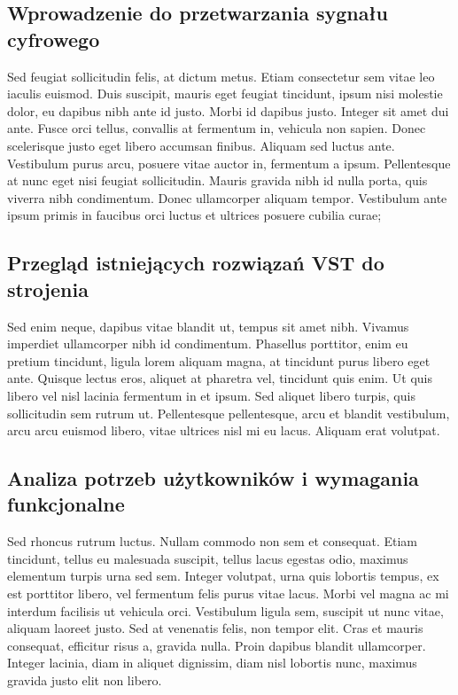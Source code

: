 \subsection{Wprowadzenie do przetwarzania sygnału cyfrowego}
\begin{spacing}{1.5} %
    Sed feugiat sollicitudin felis, at dictum metus. Etiam consectetur sem vitae leo iaculis euismod. Duis suscipit, mauris eget feugiat tincidunt, ipsum nisi molestie dolor, eu dapibus nibh ante id justo. Morbi id dapibus justo. Integer sit amet dui ante. Fusce orci tellus, convallis at fermentum in, vehicula non sapien. Donec scelerisque justo eget libero accumsan finibus. Aliquam sed luctus ante. Vestibulum purus arcu, posuere vitae auctor in, fermentum a ipsum. Pellentesque at nunc eget nisi feugiat sollicitudin. Mauris gravida nibh id nulla porta, quis viverra nibh condimentum. Donec ullamcorper aliquam tempor. Vestibulum ante ipsum primis in faucibus orci luctus et ultrices posuere cubilia curae; 
\end{spacing} %

\subsection{Przegląd istniejących rozwiązań VST do strojenia}
\begin{spacing}{1.5} %
    Sed enim neque, dapibus vitae blandit ut, tempus sit amet nibh. Vivamus imperdiet ullamcorper nibh id condimentum. Phasellus porttitor, enim eu pretium tincidunt, ligula lorem aliquam magna, at tincidunt purus libero eget ante. Quisque lectus eros, aliquet at pharetra vel, tincidunt quis enim. Ut quis libero vel nisl lacinia fermentum in et ipsum. Sed aliquet libero turpis, quis sollicitudin sem rutrum ut. Pellentesque pellentesque, arcu et blandit vestibulum, arcu arcu euismod libero, vitae ultrices nisl mi eu lacus. Aliquam erat volutpat. 
\end{spacing} %

\subsection{Analiza potrzeb użytkowników i wymagania funkcjonalne}
\begin{spacing}{1.5} %
    Sed rhoncus rutrum luctus. Nullam commodo non sem et consequat. Etiam tincidunt, tellus eu malesuada suscipit, tellus lacus egestas odio, maximus elementum turpis urna sed sem. Integer volutpat, urna quis lobortis tempus, ex est porttitor libero, vel fermentum felis purus vitae lacus. Morbi vel magna ac mi interdum facilisis ut vehicula orci. Vestibulum ligula sem, suscipit ut nunc vitae, aliquam laoreet justo. Sed at venenatis felis, non tempor elit. Cras et mauris consequat, efficitur risus a, gravida nulla. Proin dapibus blandit ullamcorper. Integer lacinia, diam in aliquet dignissim, diam nisl lobortis nunc, maximus gravida justo elit non libero. 
\end{spacing} %
